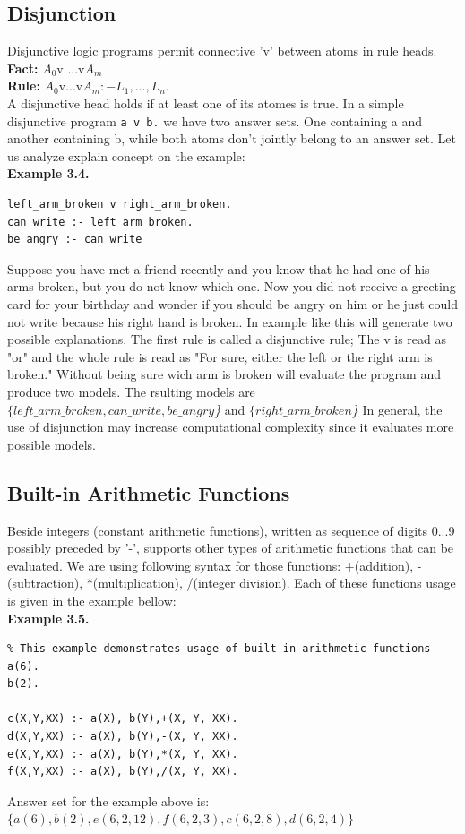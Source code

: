 \documentclass[14pt,a4paper, titlepage]{article}
\begin{document}
\subsection{Disjunction}
Disjunctive logic programs permit connective 'v' between atoms in rule heads.\\ \textbf{Fact:} $A_0$v ...v$A_m$
\\ \textbf{Rule:} $A_0$v...v$A_m :- L_1,...,L_n. $
\\ A disjunctive head holds if at least one of its atomes is true. In a simple disjunctive program \texttt{a v b.} we have two answer sets. One containing a and another containing b, while both atoms don't jointly belong to an answer set. Let us analyze explain concept on the example:
\\ \textbf{Example 3.4.}
\begin{lstlisting}
left_arm_broken v right_arm_broken.
can_write :- left_arm_broken.
be_angry :- can_write
\end{lstlisting}
Suppose you have met a friend recently and you know that he had one of his arms broken, but you do not know which one. Now you did not receive a greeting card for your birthday and wonder if you should be angry on him or he just could not write because his right hand is broken. In example like this \dlvhex{} will generate two possible explanations. The first rule is called a disjunctive rule; The v is read as "or" and the whole rule is read as "For sure, either the left or the right arm is broken." Without being sure wich arm is broken \dlvhex{} will evaluate the program and produce two models. The rsulting models are \textit{$\{left\_arm\_broken, can\_write, be\_angry$\}} and \textit{$\{right\_arm\_broken$\}}  
In general, the use of disjunction may increase computational complexity since it evaluates more possible models.        
\subsection{Built-in Arithmetic Functions}
Beside integers (constant arithmetic functions), written as sequence of digits 0...9 possibly preceded by '-', \dlvhex{} supports other types of arithmetic functions that can be evaluated. We are using following syntax for those functions: +(addition), -(subtraction), *(multiplication), /(integer division). Each of these functions usage is given in the example bellow:
\\ \textbf{Example 3.5.}
\begin{lstlisting}
% This example demonstrates usage of built-in arithmetic functions
a(6).
b(2).

c(X,Y,XX) :- a(X), b(Y),+(X, Y, XX).
d(X,Y,XX) :- a(X), b(Y),-(X, Y, XX).
e(X,Y,XX) :- a(X), b(Y),*(X, Y, XX).
f(X,Y,XX) :- a(X), b(Y),/(X, Y, XX).
\end{lstlisting}
Answer set for the example above is: \\$\{a(6),b(2),e(6,2,12),f(6,2,3),c(6,2,8),d(6,2,4)\}$
     
\end{document}
